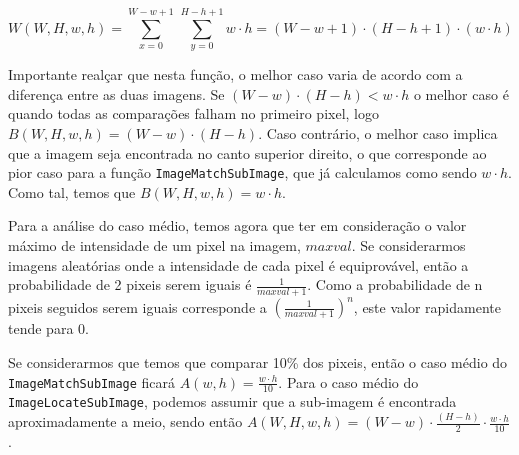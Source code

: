 \begin{equation}
	W(W,H,w,h) = \sum_{x = 0}^{W-w+1} \, \sum_{y = 0}^{H-h+1}w\cdot h = (W-w+1)\cdot(H-h+1)\cdot(w\cdot h)
\end{equation}

Importante realçar que nesta função, o melhor caso varia de acordo com a
diferença entre as duas imagens. Se $(W - w) \cdot (H - h) < w \cdot h$ o melhor
caso é quando todas as comparações falham no primeiro pixel, logo
$B(W,H,w,h) = (W - w) \cdot (H - h)$.
Caso contrário, o melhor caso implica que a imagem seja encontrada no canto
superior direito, o que corresponde ao pior caso para a função
\Verb|ImageMatchSubImage|, que já calculamos como sendo $w \cdot h$. Como tal,
temos que $B(W,H,w,h) = w\cdot h$.

Para a análise do caso médio, temos agora que ter em consideração o valor máximo
de intensidade de um pixel na imagem, $maxval$.
Se considerarmos imagens aleatórias onde a intensidade de cada pixel é
equiprovável, então a probabilidade de 2 pixeis serem iguais é
$\frac{1}{maxval + 1}$.
Como a probabilidade de n pixeis seguidos serem iguais corresponde a
$(\frac{1}{maxval + 1})^n$, este valor rapidamente tende para 0.

Se considerarmos que temos que comparar 10\% dos pixeis, então o caso médio do
\Verb|ImageMatchSubImage| ficará $A(w,h)= \frac{w \cdot h}{10}$.
Para o caso médio do \Verb|ImageLocateSubImage|, podemos assumir que a
sub-imagem é encontrada aproximadamente a meio, sendo então
$A(W,H,w,h)=(W-w)\cdot\frac{(H-h)}{2} \cdot \frac{w\cdot h}{10}$.
